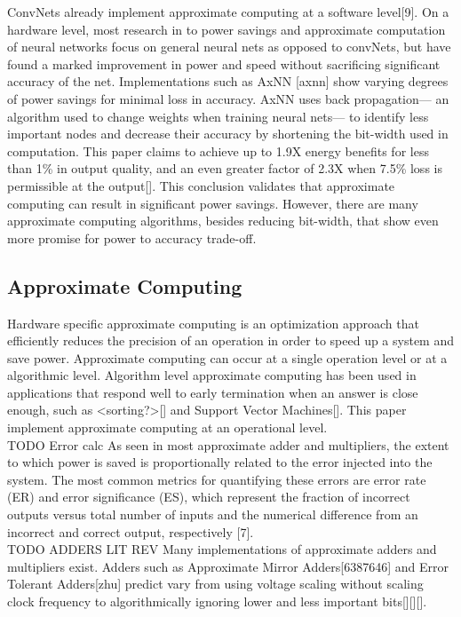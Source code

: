 \documentclass[conference]{IEEEtran}
\begin{document}
	\indent ConvNets already implement approximate computing at a software level[9]. On a hardware level, most research in to power savings and approximate computation of neural networks focus on general neural nets as opposed to convNets, but have found a marked improvement in power and speed without sacrificing significant accuracy of the net. Implementations such as AxNN [axnn] show varying degrees of power savings for minimal loss in accuracy. AxNN uses back propagation--- an algorithm used to change weights when training neural nets--- to identify less important nodes and decrease their accuracy by shortening the bit-width used in computation. This paper claims to achieve up to 1.9X energy benefits for less than 1\% in output quality, and an even greater factor of 2.3X when 7.5\% loss is permissible at the output[]. This conclusion validates that approximate computing can result in significant power savings. However, there are many approximate computing algorithms, besides reducing bit-width, that show even more promise for power to accuracy trade-off.\\
	

\subsection{Approximate Computing}

	\indent Hardware specific approximate computing is an optimization approach that efficiently reduces the precision of an operation in order to speed up a system and save power. Approximate computing can occur at a single operation level or at a algorithmic level. Algorithm level approximate computing has been used in applications that respond well to early termination when an answer is close enough, such as <sorting?>[] and Support Vector Machines[]. This paper implement approximate computing at an operational level.\\
	TODO Error calc
	\indent 	As seen in most approximate adder and multipliers, the extent to which power is saved is proportionally related to the error injected into the system. The most common metrics for quantifying these errors are error rate (ER) and error significance (ES), which represent the fraction of incorrect outputs versus total number of inputs and the numerical difference from an incorrect and correct output, respectively [7]. \\
	TODO ADDERS LIT REV
	\indent Many implementations of approximate adders and multipliers exist. Adders such as Approximate Mirror Adders[6387646] and Error Tolerant Adders[zhu] predict  vary from using voltage scaling without scaling clock frequency to algorithmically ignoring lower and less important bits[][][]. \\
	
\end{document}
